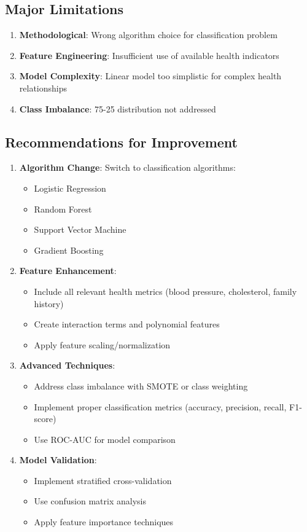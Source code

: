 \documentclass[12pt,a4paper]{article}
\begin{document}
\subsection{Major Limitations}
\begin{enumerate}
    \item \textbf{Methodological}: Wrong algorithm choice for classification problem
    \item \textbf{Feature Engineering}: Insufficient use of available health indicators
    \item \textbf{Model Complexity}: Linear model too simplistic for complex health relationships
    \item \textbf{Class Imbalance}: 75-25 distribution not addressed
\end{enumerate}

\subsection{Recommendations for Improvement}
\begin{enumerate}
    \item \textbf{Algorithm Change}: Switch to classification algorithms:
    \begin{itemize}
        \item Logistic Regression
        \item Random Forest
        \item Support Vector Machine
        \item Gradient Boosting
    \end{itemize}

    \item \textbf{Feature Enhancement}:
    \begin{itemize}
        \item Include all relevant health metrics (blood pressure, cholesterol, family history)
        \item Create interaction terms and polynomial features
        \item Apply feature scaling/normalization
    \end{itemize}

    \item \textbf{Advanced Techniques}:
    \begin{itemize}
        \item Address class imbalance with SMOTE or class weighting
        \item Implement proper classification metrics (accuracy, precision, recall, F1-score)
        \item Use ROC-AUC for model comparison
    \end{itemize}

    \item \textbf{Model Validation}:
    \begin{itemize}
        \item Implement stratified cross-validation
        \item Use confusion matrix analysis
        \item Apply feature importance techniques
    \end{itemize}
\end{enumerate}
\end{document}
